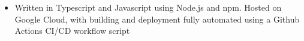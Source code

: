 \documentclass[11pt]{article}
\begin{document}
\begin{paracol}{2}
{\begin{itemize}
                

              \item Written in Typescript and Javascript using Node.js and npm. Hosted on Google Cloud, with building and deployment fully automated using a Github Actions CI/CD workflow script

                
            

        \end{itemize}

        

    
}
    \end{paracol}
\end{document}
